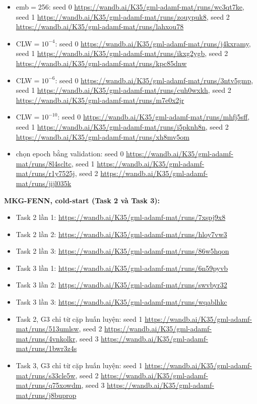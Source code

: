 \begin{itemize}
  \item emb$=$256: seed 0 \url{https://wandb.ai/K35/gml-adamf-mat/runs/wc3qt7ke}, seed 1 \url{https://wandb.ai/K35/gml-adamf-mat/runs/zouypuk8}, seed 2 \url{https://wandb.ai/K35/gml-adamf-mat/runs/lahxou78}
  \item CLW$=10^{-4}$: seed 0 \url{https://wandb.ai/K35/gml-adamf-mat/runs/j4kxramy}, seed 1 \url{https://wandb.ai/K35/gml-adamf-mat/runs/ikxg2ygb}, seed 2 \url{https://wandb.ai/K35/gml-adamf-mat/runs/kpc85dnw}
  \item CLW$=10^{-6}$: seed 0 \url{https://wandb.ai/K35/gml-adamf-mat/runs/3ntv5gmp}, seed 1 \url{https://wandb.ai/K35/gml-adamf-mat/runs/cuh0wxkh}, seed 2 \url{https://wandb.ai/K35/gml-adamf-mat/runs/m7e0x2jr}
  \item CLW$=10^{-10}$: seed 0 \url{https://wandb.ai/K35/gml-adamf-mat/runs/mhfj5sff}, seed 1 \url{https://wandb.ai/K35/gml-adamf-mat/runs/i5pknh8n}, seed 2 \url{https://wandb.ai/K35/gml-adamf-mat/runs/xh8mv5om}
  \item chọn epoch bằng validation: seed 0 \url{https://wandb.ai/K35/gml-adamf-mat/runs/8l4scltc}, seed 1 \url{https://wandb.ai/K35/gml-adamf-mat/runs/r1y7525j}, seed 2 \url{https://wandb.ai/K35/gml-adamf-mat/runs/jijl035k}
\end{itemize}
\par\smallskip\noindent\textbf{MKG-FENN, cold-start (Task 2 và Task 3):}
\begin{itemize}\itemsep0pt\parskip0pt
  \item Task 2 lần 1: \url{https://wandb.ai/K35/gml-adamf-mat/runs/7xspj9x8}
  \item Task 2 lần 2: \url{https://wandb.ai/K35/gml-adamf-mat/runs/hloy7vw3}
  \item Task 2 lần 3: \url{https://wandb.ai/K35/gml-adamf-mat/runs/86w5hqon}
  \item Task 3 lần 1: \url{https://wandb.ai/K35/gml-adamf-mat/runs/6n59pyvb}
  \item Task 3 lần 2: \url{https://wandb.ai/K35/gml-adamf-mat/runs/swvbyr32}
  \item Task 3 lần 3: \url{https://wandb.ai/K35/gml-adamf-mat/runs/wqablhkc}
  \item Task 2, G3 chỉ từ cặp huấn luyện: seed 1 \url{https://wandb.ai/K35/gml-adamf-mat/runs/513umlsw}, seed 2 \url{https://wandb.ai/K35/gml-adamf-mat/runs/4vnkolkr}, seed 3 \url{https://wandb.ai/K35/gml-adamf-mat/runs/1bwr3z4s}
  \item Task 3, G3 chỉ từ cặp huấn luyện: seed 1 \url{https://wandb.ai/K35/gml-adamf-mat/runs/s33cle5w}, seed 2 \url{https://wandb.ai/K35/gml-adamf-mat/runs/q75xowdm}, seed 3 \url{https://wandb.ai/K35/gml-adamf-mat/runs/j8buprop}
\end{itemize}

